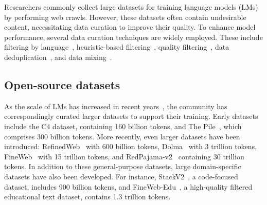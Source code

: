 Researchers commonly collect large datasets for training language models (LMs)\cite{mann2020language} by performing web crawls. However, these datasets often contain undesirable content, necessitating data curation to improve their quality. To enhance model performance\cite{penedo2023refinedweb, rae2021scaling, mann2020language, wenzek2019ccnet}, several data curation techniques are widely employed. These include filtering by language~\cite{xue2020mt5,raffel2020exploring,conneau2019cross}, heuristic-based filtering~\cite{penedo2023refinedweb, chen2021evaluating, gao2020pile}, quality filtering~\cite{sachdeva2024train, longpre2023pretrainer, du2022glam}, data deduplication~\cite{lee2021deduplicating,agarwal2009url}, and data mixing~\cite{li2024datacomp, albalak2023efficient, shen2023slimpajama}.




\subsection{Open-source datasets}\label{sec2.3}

As the scale of LMs has increased in recent years~\cite{dubey2024llama, team2024gemma, chowdhery2023palm, achiam2023gpt}, the community has correspondingly curated larger datasets to support their training. Early datasets include the C4 dataset, containing 160 billion tokens, and The Pile~\cite{gao2020pile}, which comprises 300 billion tokens. More recently, even larger datasets have been introduced: RefinedWeb~\cite{penedo2023refinedweb} with 600 billion tokens, Dolma~\cite{soldaini2024dolma} with 3 trillion tokens, FineWeb~\cite{penedo2024fineweb} with 15 trillion tokens, and RedPajama-v2~\cite{ostendorffllm} containing 30 trillion tokens. In addition to these general-purpose datasets, large domain-specific datasets have also been developed. For instance, StackV2~\cite{lozhkov2024starcoder}, a code-focused dataset, includes 900 billion tokens, and FineWeb-Edu~\cite{penedo2024fineweb}, a high-quality filtered educational text dataset, contains 1.3 trillion tokens.

